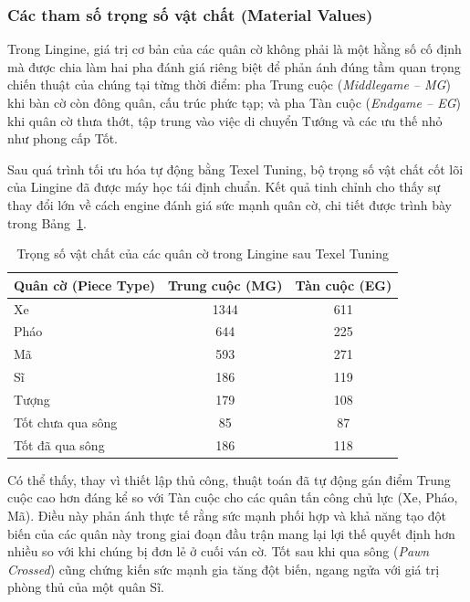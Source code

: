\subsubsection{Các tham số trọng số vật chất (Material Values)}

Trong Lingine, giá trị cơ bản của các quân cờ không phải là một hằng số cố định mà được chia làm hai pha đánh giá riêng biệt để phản ánh đúng tầm quan trọng chiến thuật của chúng tại từng thời điểm: pha Trung cuộc (\textit{Middlegame -- MG}) khi bàn cờ còn đông quân, cấu trúc phức tạp; và pha Tàn cuộc (\textit{Endgame -- EG}) khi quân cờ thưa thớt, tập trung vào việc di chuyển Tướng và các ưu thế nhỏ như phong cấp Tốt.

Sau quá trình tối ưu hóa tự động bằng Texel Tuning, bộ trọng số vật chất cốt lõi của Lingine đã được máy học tái định chuẩn. Kết quả tinh chỉnh cho thấy sự thay đổi lớn về cách engine đánh giá sức mạnh quân cờ, chi tiết được trình bày trong Bảng~\ref{tab:material_values}.

\begin{table}[htbp]
    \centering
    \begin{tabular}{lcc}
        \toprule
        \textbf{Quân cờ (Piece Type)} & \textbf{Trung cuộc (MG)} & \textbf{Tàn cuộc (EG)} \\
        \midrule
        Xe & 1344 & 611 \\
        Pháo & 644 & 225 \\
        Mã & 593 & 271 \\
        Sĩ & 186 & 119 \\
        Tượng & 179 & 108 \\
        Tốt chưa qua sông & 85 & 87 \\
        Tốt đã qua sông & 186 & 118 \\
        \bottomrule
    \end{tabular}
    \caption{Trọng số vật chất của các quân cờ trong Lingine sau Texel Tuning}
    \label{tab:material_values}
\end{table}

Có thể thấy, thay vì thiết lập thủ công, thuật toán đã tự động gán điểm Trung cuộc cao hơn đáng kể so với Tàn cuộc cho các quân tấn công chủ lực (Xe, Pháo, Mã). Điều này phản ánh thực tế rằng sức mạnh phối hợp và khả năng tạo đột biến của các quân này trong giai đoạn đầu trận mang lại lợi thế quyết định hơn nhiều so với khi chúng bị đơn lẻ ở cuối ván cờ. Tốt sau khi qua sông (\textit{Pawn Crossed}) cũng chứng kiến sức mạnh gia tăng đột biến, ngang ngửa với giá trị phòng thủ của một quân Sĩ.

